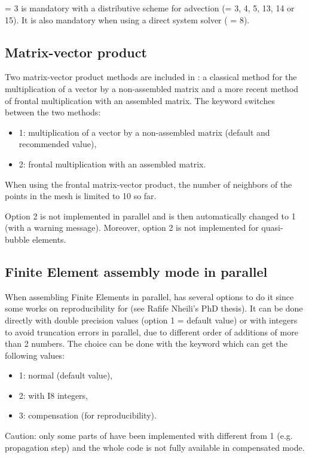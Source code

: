  = 3 is mandatory with a distributive scheme
for advection (= 3, 4, 5, 13, 14 or 15).
It is also mandatory when using a direct system solver ( = 8).


\subsection{Matrix-vector product}

Two matrix-vector product methods are included in :
a classical method for the multiplication of a vector by a non-assembled matrix
and a more recent method of frontal multiplication with an assembled matrix.
The keyword  switches between the two methods:

\begin{itemize}
\item 1: multiplication of a vector by a non-assembled matrix
(default and recommended value),

\item 2: frontal multiplication with an assembled matrix.
\end{itemize}

When using the frontal matrix-vector product,
the number of neighbors of the points in the mesh is limited to 10 so far.

Option 2 is not implemented in parallel and is then automatically changed to 1
(with a warning message).
Moreover, option 2 is not implemented for quasi-bubble elements.


\subsection{Finite Element assembly mode in parallel}

When assembling Finite Elements in parallel,  has several options
to do it since some works on reproducibility for \tel
(see Rafife Nheili's PhD thesis).
It can be done directly with double precision values
(option 1 = default value)
or with integers to avoid truncation errors in parallel, due to different
order of additions of more than 2 numbers.
The choice can be done with the keyword 
which can get the following values:
\begin{itemize}
\item 1: normal (default value),
\item 2: with I8 integers,
\item 3: compensation (for reproducibility).
\end{itemize}
Caution: only some parts of  have been implemented
with  different from 1
(e.g. propagation step) and the whole code is not fully available
in compensated mode.


